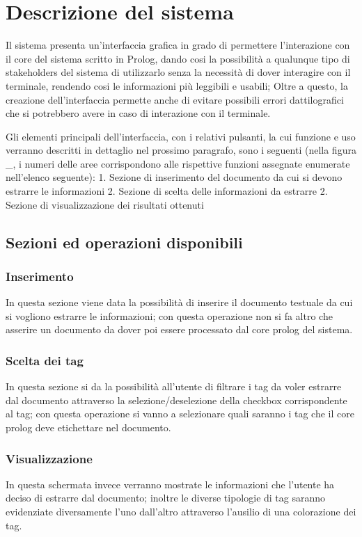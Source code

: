 \section{Descrizione del sistema}

Il sistema presenta un'interfaccia grafica in grado di permettere l'interazione con il core del sistema scritto in Prolog, dando cosi la possibilità a qualunque tipo di stakeholders del sistema di utilizzarlo senza la necessità di dover interagire con il terminale, rendendo cosi le informazioni più leggibili e usabili; Oltre a questo, la creazione dell'interfaccia permette anche di evitare possibili errori dattilografici che si potrebbero avere in caso di interazione con il terminale.

Gli elementi principali dell’interfaccia, con i relativi pulsanti, la cui funzione e uso verranno descritti in dettaglio nel prossimo paragrafo, sono i seguenti (nella figura _, i numeri delle aree corrispondono alle rispettive funzioni assegnate enumerate
nell’elenco seguente):
1. Sezione di inserimento del documento da cui si devono estrarre le informazioni
2. Sezione di scelta delle informazioni da estrarre
2. Sezione di visualizzazione dei risultati ottenuti

\subsection{Sezioni ed operazioni disponibili}
    \subsubsection{Inserimento}
    In questa sezione viene data la possibilità di inserire il documento testuale da cui si vogliono estrarre le informazioni; con questa operazione non si fa altro che asserire un documento da dover poi essere processato dal core prolog del sistema.
    \subsubsection{Scelta dei tag}
    In questa sezione si da la possibilità all'utente di filtrare i tag da voler estrarre dal documento attraverso la selezione/deselezione della checkbox corrispondente al tag; con questa operazione si vanno a selezionare quali saranno i tag che il core prolog deve etichettare nel documento.
    \subsubsection{Visualizzazione}
    In questa schermata invece verranno mostrate le informazioni che l'utente ha deciso di estrarre dal documento; inoltre le diverse tipologie di tag saranno evidenziate diversamente l'uno dall'altro attraverso l'ausilio di una colorazione dei tag. 

